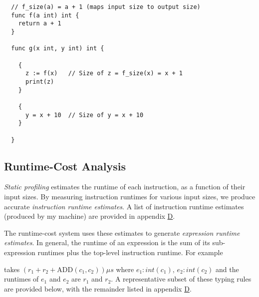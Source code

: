 \begin{verbatim}
  // f_size(a) = a + 1 (maps input size to output size)
  func f(a int) int { 
    return a + 1
  }

  func g(x int, y int) int { 

    {
      z := f(x)   // Size of z = f_size(x) = x + 1
      print(z)
    } 

    {
      y = x + 10  // Size of y = x + 10 
    }

  }
\end{verbatim}

\subsection{Runtime-Cost Analysis}

\label{sec:3.5.2}

\textit{Static profiling} estimates the runtime of each instruction, as a function of their input sizes. By measuring instruction runtimes for various input sizes, we produce accurate \textit{instruction runtime estimates}. A list of instruction runtime estimates (produced by my machine) are provided in appendix \hyperref[sec:D]{D}.

The runtime-cost system uses these estimates to generate \textit{expression runtime estimates}. In general, the runtime of an expression is the sum of its sub-expression runtimes plus the top-level instruction runtime. For example  takes \( (r_1 + r_2 + \text{ADD}(c_1, c_2)) \mu s\) where \( e_1 : \textit{int}(c_1), \, e_2 : \textit{int}(c_2) \) and the runtimes of \( e_1 \) and \( e_2 \) are \( r_1 \) and \( r_2 \). A representative subset of these typing rules are provided below, with the remainder listed in appendix \hyperref[sec:D]{D}.

\begin{prooftree}
\end{prooftree}

\begin{prooftree}
\end{prooftree}

